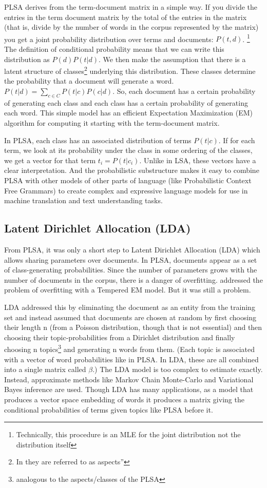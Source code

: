 PLSA derives from the term-document matrix in a simple way. If you divide the
entries in the term document matrix by the total of the entries in the matrix
(that is, divide by the number of words in the corpus represented by the matrix)
you get a joint probability distribution over terms and documents: $P(t,d)$.
\footnote{Technically, this procedure is an MLE for the joint distribution 
not the distribution itself} The definition of conditional probability means 
that we can write this distribution as $P(d)P(t|d)$. We then make the 
assumption that there is a latent structure of 
classes\footnote{In \citep{Hofmann1999} they are referred to as 
aspects''} underlying this distribution. These classes determine the 
probability that a document will generate a word. 
$P(t|d)=\sum_{c\in C}P(t|c)P(c|d)$. So, each document has a certain probability
of generating each class and each class has a certain probability of generating
each word. This simple model has an efficient Expectation Maximization (EM) 
algorithm for computing it starting with the term-document matrix.

In PLSA, each class has an associated distribution of terms $P(t|c)$. If for 
each term, we look at its probability under the class in some ordering of the 
classes, we get a vector for that term $t_i = P(t|c_i)$. Unlike in LSA, these
vectors have a clear interpretation. And the probabilistic substructure makes
it easy to combine PLSA with other models of other parts of language (like 
Probabilistic Context Free Grammars) to create complex and expressive language
models for use in machine translation and text understanding tasks.

\subsection{Latent Dirichlet Allocation (LDA)}

From PLSA, it was only a short step to Latent Dirichlet Allocation (LDA) which 
allows sharing parameters over documents. In PLSA, documents appear as a set of 
class-generating probabilities. Since the number of parameters grows with the 
number of documents in the corpus, there is a danger of overfitting. 
\citep{Hofmann1999} addressed the problem of overfitting with a Tempered EM 
model. But it was still a problem.

LDA addressed this by eliminating the document as an entity from the training
set and instead assumed that documents are chosen at random by first choosing
their length n (from a Poisson distribution, though that is not essential) and
then choosing their topic-probabilities from a Dirichlet distribution and
finally choosing n topics\footnote{analogous to the aspects/classes of the PLSA}
and generating n words from them. (Each topic is
associated with a vector of word probabilities like in PLSA. In LDA, these are
all combined into a single matrix called $\beta$.)
\citep{Blei2003} The LDA model is too complex to estimate exactly. Instead, 
approximate methods like Markov Chain Monte-Carlo and Variational Bayes 
inference are used. Though LDA has many applications, as a model that
produces a vector space embedding of words it produces
a matrix giving the conditional probabilities of terms given topics like PLSA 
before it.

